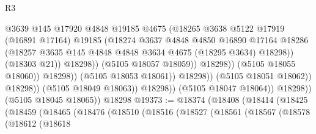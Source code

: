 \begin{lexlean}{R3}
\begin{coremodule}
                                              @3639
                                              @145
                                              @17920
                                              @4848
                                              @19185
                                              @4675
                                              (@18265
                                                @3638
                                                @5122
                                                @17919
                                                (@16891 @17164)
                                                @19185
                                                (@18274
                                                  @3637
                                                  @4848
                                                  @4850
                                                  @16890
                                                  @17164
                                                  @18286
                                                  (@18257
                                                    @3635
                                                    @145
                                                    @4848
                                                    @4848
                                                    @3634
                                                    @4675
                                                    (@18295 @3634)
                                                    @18298))
                                                (@18303 @21))
                                              @18298))
                                          (@5105 @18057 @18059))
                                        @18298))
                                    (@5105 @18055 @18060))
                                  @18298))
                              (@5105 @18053 @18061))
                            @18298))
                        (@5105 @18051 @18062))
                      @18298))
                  (@5105 @18049 @18063))
                @18298))
            (@5105 @18047 @18064))
          @18298))
      (@5105 @18045 @18065))
    @18298
@19373 := @18374
    (@18408
      (@18414
        (@18425
          (@18459
            (@18465
              (@18476
                (@18510
                  (@18516
                    (@18527
                      (@18561
                        (@18567
                          (@18578
                            (@18612
                              (@18618

\end{coremodule}
\end{lexlean}
